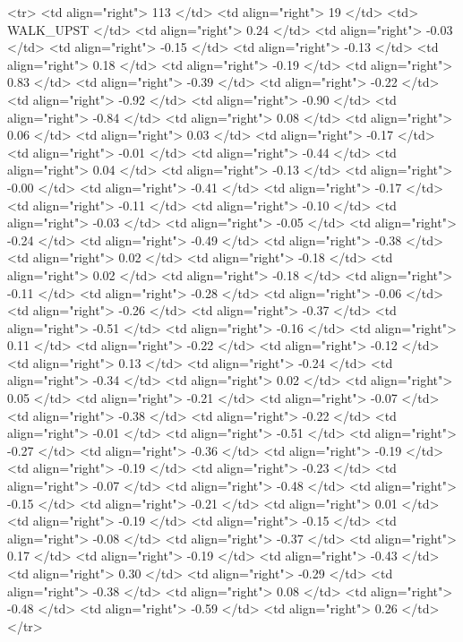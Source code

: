   <tr> <td align="right"> 113 </td> <td align="right">  19 </td> <td> WALK_UPST </td> <td align="right"> 0.24 </td> <td align="right"> -0.03 </td> <td align="right"> -0.15 </td> <td align="right"> -0.13 </td> <td align="right"> 0.18 </td> <td align="right"> -0.19 </td> <td align="right"> 0.83 </td> <td align="right"> -0.39 </td> <td align="right"> -0.22 </td> <td align="right"> -0.92 </td> <td align="right"> -0.90 </td> <td align="right"> -0.84 </td> <td align="right"> 0.08 </td> <td align="right"> 0.06 </td> <td align="right"> 0.03 </td> <td align="right"> -0.17 </td> <td align="right"> -0.01 </td> <td align="right"> -0.44 </td> <td align="right"> 0.04 </td> <td align="right"> -0.13 </td> <td align="right"> -0.00 </td> <td align="right"> -0.41 </td> <td align="right"> -0.17 </td> <td align="right"> -0.11 </td> <td align="right"> -0.10 </td> <td align="right"> -0.03 </td> <td align="right"> -0.05 </td> <td align="right"> -0.24 </td> <td align="right"> -0.49 </td> <td align="right"> -0.38 </td> <td align="right"> 0.02 </td> <td align="right"> -0.18 </td> <td align="right"> 0.02 </td> <td align="right"> -0.18 </td> <td align="right"> -0.11 </td> <td align="right"> -0.28 </td> <td align="right"> -0.06 </td> <td align="right"> -0.26 </td> <td align="right"> -0.37 </td> <td align="right"> -0.51 </td> <td align="right"> -0.16 </td> <td align="right"> 0.11 </td> <td align="right"> -0.22 </td> <td align="right"> -0.12 </td> <td align="right"> 0.13 </td> <td align="right"> -0.24 </td> <td align="right"> -0.34 </td> <td align="right"> 0.02 </td> <td align="right"> 0.05 </td> <td align="right"> -0.21 </td> <td align="right"> -0.07 </td> <td align="right"> -0.38 </td> <td align="right"> -0.22 </td> <td align="right"> -0.01 </td> <td align="right"> -0.51 </td> <td align="right"> -0.27 </td> <td align="right"> -0.36 </td> <td align="right"> -0.19 </td> <td align="right"> -0.19 </td> <td align="right"> -0.23 </td> <td align="right"> -0.07 </td> <td align="right"> -0.48 </td> <td align="right"> -0.15 </td> <td align="right"> -0.21 </td> <td align="right"> 0.01 </td> <td align="right"> -0.19 </td> <td align="right"> -0.15 </td> <td align="right"> -0.08 </td> <td align="right"> -0.37 </td> <td align="right"> 0.17 </td> <td align="right"> -0.19 </td> <td align="right"> -0.43 </td> <td align="right"> 0.30 </td> <td align="right"> -0.29 </td> <td align="right"> -0.38 </td> <td align="right"> 0.08 </td> <td align="right"> -0.48 </td> <td align="right"> -0.59 </td> <td align="right"> 0.26 </td> </tr>
